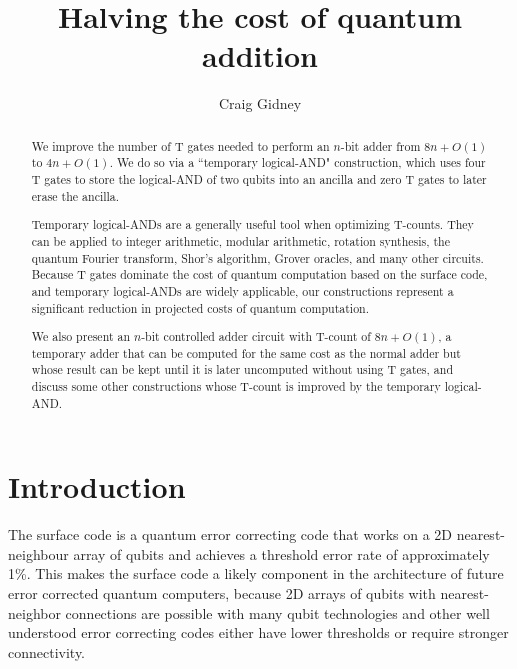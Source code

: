 \documentclass[twocolumn]{revtex4-1}
\begin{document}
\title{Halving the cost of quantum addition}
\author{Craig Gidney}

\begin{abstract}
We improve the number of T gates needed to perform an $n$-bit adder from $8n + O(1)$ \citep{Amy2013, Cuccaro2004, AustinDiscussionsAndEmails2017} to $4n + O(1)$.
We do so via a ``temporary logical-AND" construction, which uses four T gates to store the logical-AND of two qubits into an ancilla and zero T gates to later erase the ancilla.

Temporary logical-ANDs are a generally useful tool when optimizing T-counts.
They can be applied to integer arithmetic, modular arithmetic, rotation synthesis, the quantum Fourier transform, Shor's algorithm, Grover oracles, and many other circuits.
Because T gates dominate the cost of quantum computation based on the surface code, and temporary logical-ANDs are widely applicable, our constructions represent a significant reduction in projected costs of quantum computation.

We also present an $n$-bit controlled adder circuit with T-count of $8n + O(1)$, a temporary adder that can be computed for the same cost as the normal adder but whose result can be kept until it is later uncomputed without using T gates, and discuss some other constructions whose T-count is improved by the temporary logical-AND.
\end{abstract}

\maketitle

\section{Introduction}
\label{sec:introduction}

The surface code \citep{Brav98,Denn02,Raus07,Raus07d,Fowler2012} is a quantum error correcting code that works on a 2D nearest-neighbour array of qubits and achieves a threshold error rate of approximately 1\%.
This makes the surface code a likely component in the architecture of future error corrected quantum computers, because 2D arrays of qubits with nearest-neighbor connections are possible with many qubit technologies \citep{Schl11,Bare13,Gamb17,Leik17,Laht17} and other well understood error correcting codes either have lower thresholds or require stronger connectivity.
\end{document}
